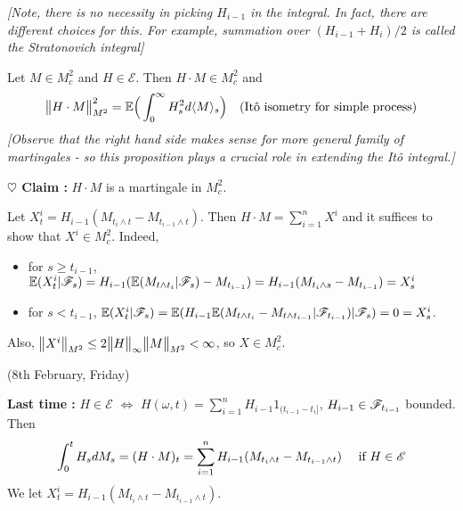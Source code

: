 \documentclass[12pt,a4paper]{article}
\newenvironment{proof}
{\begin{changemargin}{0.5cm}{0.5cm} 
	}%
	{\end{changemargin}
}
\newenvironment{subproof}
{\begin{changemargin}{0.5cm}{0.5cm} 
	}%
	{\end{changemargin}
}
\newenvironment{p}
{\begin{proof} 
	}%
	{\end{proof}
}
\begin{document}
\emph{[Note, there is no necessity in picking $H_{i-1}$ in the integral. In fact, there are different choices for this. For example, summation over $(H_{i-1} + H_i)/2$ is called the Stratonovich integral]}
\s

\prop Let $M \in M_c^2$ and $H\in \mathscr{E}$. Then $H\cdot M\in M_c^2$ and
\begin{align*}
\bigl\lVert H \cdot M\bigr\rVert_{M^2}^2 = \mathbb{E} \Big( \int_0^{\infty} H_s^2 d\langle M \rangle_s \Big) \quad \text{(It\^o isometry for simple process)}
\end{align*}
\emph{[Observe that the right hand side makes sense for more general family of martingales - so this proposition plays a crucial role in extending the It\^o integral.]}
\begin{p}
\pf

\textbf{$\heartsuit$ Claim :} $H\cdot M$ is a martingale in $M_c^2$.
\begin{subproof}
Let $X_t^i = H_{i-1} (M_{t_i \wedge t} - M_{t_{i-1} \wedge t})$. Then $H\cdot M = \sum_{i=1}^n X^i$ and it suffices to show that $X^i \in M_c^2$. Indeed,
\begin{itemize}
\item for $s\geq t_{i-1}$, $\mathbb{E} (X_t^i | \mathscr{F}_s) = H_{i-1} (\mathbb{E}(M_{t\wedge t_i}|\mathscr{F}_s) - M_{t_{i-1}}) = H_{i-1}(M_{t_i\wedge s} - M_{t_{i-1}}) = X^i_s$
\item for $s< t_{i-1}$, $\mathbb{E}(X_t^i |\mathscr{F}_s) = \mathbb{E}(H_{i-1} \mathbb{E}(M_{t\wedge t_i} - M_{t\wedge t_{i-1}}|\mathscr{F}_{t_{i-1}}) |\mathscr{F}_s) = 0 = X^i_s$.
\end{itemize}
Also, $\bigl\lVert X^i\bigr\rVert_{M^2} \leq 2\bigl\lVert H\bigr\rVert_{\infty} \bigl\lVert M\bigr\rVert_{M^2} < \infty$, so $X\in M_c^2$.
\end{subproof}
\end{p}
\s

\newday

(8th February, Friday)
\s

\textbf{Last time :} $H\in \mathscr{E}$ $\Leftrightarrow$ $H(\omega, t)=\sum_{i=1}^n H_{i-1}1_{(t_{i-1}-t_i]}$, $H_{i-1}\in \mathscr{F}_{t_{i-1}}$ bounded. Then
\begin{align*}
\int_0^t H_s dM_s = (H\cdot M)_t =\sum_{i=1}^n H_{i-1} (M_{t_i \wedge t} - M_{t_{i-1}\wedge t}) \quad \text{ if } H\in \mathscr{E}
\end{align*}
We let $X_t^i =H_{i-1} (M_{t_i \wedge t} - M_{t_{i-1}\wedge t})$.
\s
\end{document}
